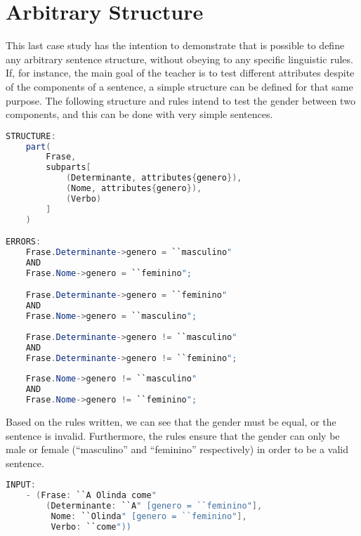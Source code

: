 \section{Arbitrary Structure}

This last case study has the intention to demonstrate that is possible to define any arbitrary sentence structure, without obeying to any specific linguistic rules. If, for instance, the main goal of the teacher is to test
different attributes despite of the components of a sentence, a simple structure can be defined for that same purpose. The following structure and rules intend to test the gender between two components, and this can be done 
with very simple sentences.

\begin{center}
\begin{minipage}{10cm}
\begin{lstlisting}[language=java, basicstyle=\tiny, label={lst:arbitrary_structure}, caption=Example of an arbitrary sentence structure]
STRUCTURE:
    part(
        Frase,
        subparts[
            (Determinante, attributes{genero}),
            (Nome, attributes{genero}),
            (Verbo)
        ]
    )

ERRORS:
    Frase.Determinante->genero = ``masculino" 
    AND
    Frase.Nome->genero = ``feminino";

    Frase.Determinante->genero = ``feminino" 
    AND
    Frase.Nome->genero = ``masculino";
    
    Frase.Determinante->genero != ``masculino"
    AND 
    Frase.Determinante->genero != ``feminino";
    
    Frase.Nome->genero != ``masculino" 
    AND 
    Frase.Nome->genero != ``feminino";
\end{lstlisting}
\end{minipage}
\end{center}

Based on the rules written, we can see that the gender must be equal, or the sentence is invalid. Furthermore, the rules ensure that the gender can only be male or female (``masculino'' and ``feminino'' respectively) in order
to be a valid sentence.

\begin{center}
\begin{minipage}{10cm}
\begin{lstlisting}[language=java, basicstyle=\tiny, label={lst:arbitrary_structure_input}, caption=Example of an arbitrary sentence input]
INPUT:
    - (Frase: ``A Olinda come"
        (Determinante: ``A" [genero = ``feminino"],
         Nome: ``Olinda" [genero = ``feminino"],
         Verbo: ``come"))
\end{lstlisting}
\end{minipage}
\end{center}

